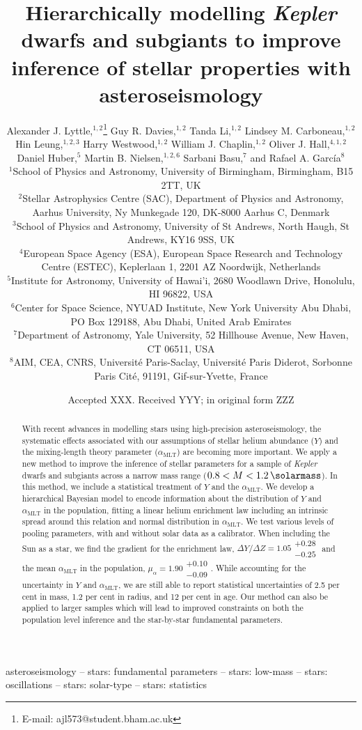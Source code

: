 \documentclass[a4paper,fleqn,usenatbib]{mnras}
\title[Hierarchically modelling dwarfs and subgiants]{%
    Hierarchically modelling \emph{Kepler} dwarfs and subgiants to improve inference of stellar properties with asteroseismology
}
\author[A. J. Lyttle et al.]{%
Alexander J. Lyttle,$^{1,2}$\thanks{E-mail: ajl573@student.bham.ac.uk}
Guy R. Davies,$^{1,2}$
Tanda Li,$^{1,2}$
Lindsey M. Carboneau,$^{1,2}$
\newauthor
Hin Leung,$^{1,2,3}$
Harry Westwood,$^{1,2}$
William J. Chaplin,$^{1,2}$
Oliver J. Hall,$^{4,1,2}$
\newauthor
Daniel Huber,$^{5}$
Martin B. Nielsen,$^{1,2,6}$
Sarbani Basu,$^{7}$
and Rafael A. Garc\'ia$^{8}$
\\
$^{1}$School of Physics and Astronomy, University of Birmingham, Birmingham, B15 2TT, UK\\
$^{2}$Stellar Astrophysics Centre (SAC), Department of Physics and Astronomy, Aarhus University, Ny Munkegade 120, DK-8000 Aarhus C, Denmark\\
$^{3}$School of Physics and Astronomy, University of St Andrews, North Haugh, St Andrews, KY16 9SS, UK\\
$^{4}$European Space Agency (ESA), European Space Research and Technology Centre (ESTEC), Keplerlaan 1, 2201 AZ Noordwijk, Netherlands\\
$^{5}$Institute for Astronomy, University of Hawai'i, 2680 Woodlawn Drive, Honolulu, HI 96822, USA\\
$^{6}$Center for Space Science, NYUAD Institute, New York University Abu Dhabi, PO Box 129188, Abu Dhabi, United Arab Emirates\\
$^{7}$Department of Astronomy, Yale University, 52 Hillhouse Avenue, New Haven, CT 06511, USA\\
$^{8}$AIM, CEA, CNRS, Universit\'e Paris-Saclay, Universit\'e Paris Diderot, Sorbonne Paris Cit\'e, 91191, Gif-sur-Yvette, France\\
}
\date{Accepted XXX. Received YYY; in original form ZZZ}
\newcommand{\mlt}{\ensuremath{{\alpha_\mathrm{MLT}}}}
\begin{document}
\label{firstpage}
\pagerange{\pageref{firstpage}--\pageref{lastpage}}
\maketitle

\begin{abstract}
    With recent advances in modelling stars using high-precision asteroseismology, the systematic effects associated with our assumptions of stellar helium abundance ($Y$) and the mixing-length theory parameter ($\mlt$) are becoming more important. We apply a new method to improve the inference of stellar parameters for a sample of \emph{Kepler} dwarfs and subgiants across a narrow mass range ($0.8 < M < \SI{1.2}{\solarmass}$). In this method, we include a statistical treatment of $Y$ and the $\mlt$. We develop a hierarchical Bayesian model to encode information about the distribution of $Y$ and $\mlt$ in the population, fitting a linear helium enrichment law including an intrinsic spread around this relation and normal distribution in $\mlt$. We test various levels of pooling parameters, with and without solar data as a calibrator. When including the Sun as a star, we find the gradient for the enrichment law, $\Delta Y / \Delta Z = 1.05\substack{+0.28\\-0.25}$ and the mean $\mlt$ in the population, $\mu_\alpha = 1.90\substack{+0.10\\-0.09}$. While accounting for the uncertainty in $Y$ and $\mlt$, we are still able to report statistical uncertainties of 2.5 per cent in mass, 1.2 per cent in radius, and 12 per cent in age. Our method can also be applied to larger samples which will lead to improved constraints on both the population level inference and the star-by-star fundamental parameters.
\end{abstract}

\begin{keywords}

asteroseismology -- stars: fundamental parameters -- stars: low-mass -- stars: oscillations -- stars: solar-type -- stars: statistics

\end{keywords}


\end{document}
